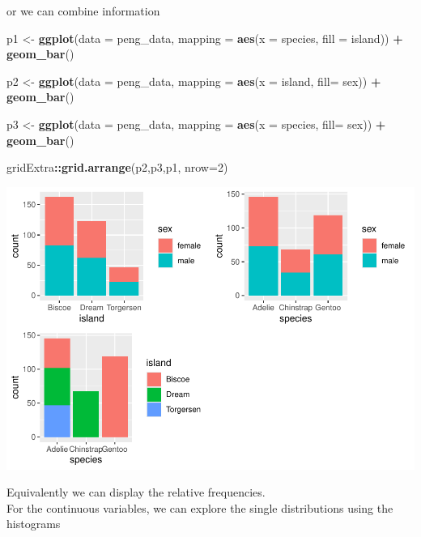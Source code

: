 \documentclass[
]{article}
\newenvironment{Shaded}{\begin{snugshade}}{\end{snugshade}}
\newcommand{\AttributeTok}[1]{\textcolor[rgb]{0.13,0.29,0.53}{#1}}
\newcommand{\DecValTok}[1]{\textcolor[rgb]{0.00,0.00,0.81}{#1}}
\newcommand{\FunctionTok}[1]{\textcolor[rgb]{0.13,0.29,0.53}{\textbf{#1}}}
\newcommand{\NormalTok}[1]{#1}
\newcommand{\OtherTok}[1]{\textcolor[rgb]{0.56,0.35,0.01}{#1}}
\newcommand{\SpecialCharTok}[1]{\textcolor[rgb]{0.81,0.36,0.00}{\textbf{#1}}}
\begin{document}
or we can combine information

\begin{Shaded}
\begin{Highlighting}[]
\NormalTok{p1 }\OtherTok{\textless{}{-}} \FunctionTok{ggplot}\NormalTok{(}\AttributeTok{data =}\NormalTok{ peng\_data, }\AttributeTok{mapping =} \FunctionTok{aes}\NormalTok{(}\AttributeTok{x =}\NormalTok{ species, }\AttributeTok{fill =}\NormalTok{  island)) }\SpecialCharTok{+} 
  \FunctionTok{geom\_bar}\NormalTok{()}

\NormalTok{p2 }\OtherTok{\textless{}{-}} \FunctionTok{ggplot}\NormalTok{(}\AttributeTok{data =}\NormalTok{ peng\_data, }\AttributeTok{mapping =} \FunctionTok{aes}\NormalTok{(}\AttributeTok{x =}\NormalTok{ island, }\AttributeTok{fill=}\NormalTok{ sex)) }\SpecialCharTok{+} 
  \FunctionTok{geom\_bar}\NormalTok{()}

\NormalTok{p3 }\OtherTok{\textless{}{-}} \FunctionTok{ggplot}\NormalTok{(}\AttributeTok{data =}\NormalTok{ peng\_data, }\AttributeTok{mapping =} \FunctionTok{aes}\NormalTok{(}\AttributeTok{x =}\NormalTok{ species, }\AttributeTok{fill=}\NormalTok{ sex)) }\SpecialCharTok{+} 
  \FunctionTok{geom\_bar}\NormalTok{()}

\NormalTok{gridExtra}\SpecialCharTok{::}\FunctionTok{grid.arrange}\NormalTok{(p2,p3,p1, }\AttributeTok{nrow=}\DecValTok{2}\NormalTok{)}
\end{Highlighting}
\end{Shaded}

\includegraphics{EDA_files/figure-latex/unnamed-chunk-28-1.pdf}

Equivalently we can display the relative frequencies.\\
For the continuous variables, we can explore the single distributions
using the histograms
\end{document}
